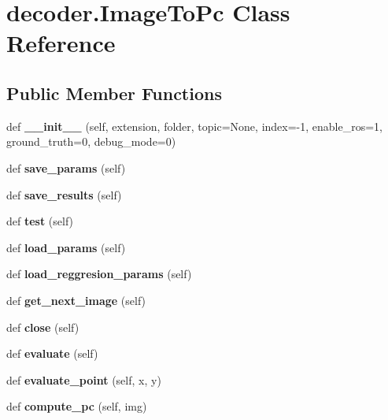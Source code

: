 \hypertarget{classdecoder_1_1ImageToPc}{}\section{decoder.\+Image\+To\+Pc Class Reference}
\label{classdecoder_1_1ImageToPc}
\subsection*{Public Member Functions}
\begin{DoxyCompactItemize}
\item 
\mbox{\label{classdecoder_1_1ImageToPc_ac65c4fe08d6a5a7d745fea2815afdc04}} 
def {\bfseries \+\_\+\+\_\+init\+\_\+\+\_\+} (self, extension, folder, topic=None, index=-\/1, enable\+\_\+ros=1, ground\+\_\+truth=0, debug\+\_\+mode=0)
\item 
\mbox{\label{classdecoder_1_1ImageToPc_a2a46ebbbe1a00150b058d5cc97632ce9}} 
def {\bfseries save\+\_\+params} (self)
\item 
\mbox{\label{classdecoder_1_1ImageToPc_a1bc8e4fc6a23e3761760585c141b1f4e}} 
def {\bfseries save\+\_\+results} (self)
\item 
\mbox{\label{classdecoder_1_1ImageToPc_ad662ff0f54c288ba86205c18898cb022}} 
def {\bfseries test} (self)
\item 
\mbox{\label{classdecoder_1_1ImageToPc_af30a114830808c48bf8fd9041314fc90}} 
def {\bfseries load\+\_\+params} (self)
\item 
\mbox{\label{classdecoder_1_1ImageToPc_a4ca966b8091daf2c14536062804265ea}} 
def {\bfseries load\+\_\+reggresion\+\_\+params} (self)
\item 
\mbox{\label{classdecoder_1_1ImageToPc_adb078ebdaf1bef6c1a7d3fb1e46d3cc7}} 
def {\bfseries get\+\_\+next\+\_\+image} (self)
\item 
\mbox{\label{classdecoder_1_1ImageToPc_a8de731f6e6905ee77d122538f64e420f}} 
def {\bfseries close} (self)
\item 
\mbox{\label{classdecoder_1_1ImageToPc_ac401090fb920c30d60e20f4634841300}} 
def {\bfseries evaluate} (self)
\item 
\mbox{\label{classdecoder_1_1ImageToPc_a905fbfb2076133608c8b844f6abab919}} 
def {\bfseries evaluate\+\_\+point} (self, x, y)
\item 
\mbox{\label{classdecoder_1_1ImageToPc_a0ec763748141f134834182549e61b749}} 
def {\bfseries compute\+\_\+pc} (self, img)
\end{DoxyCompactItemize}
